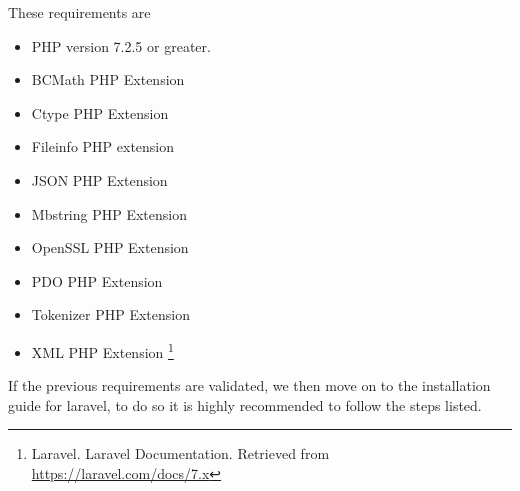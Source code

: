 \medskip These requirements are 
\begin{itemize}
    \item PHP version 7.2.5 or greater. 
    \item BCMath PHP Extension
    \item Ctype PHP Extension
    \item Fileinfo PHP extension
    \item JSON PHP Extension
    \item Mbstring PHP Extension
    \item OpenSSL PHP Extension
    \item PDO PHP Extension
    \item Tokenizer PHP Extension
    \item XML PHP Extension
\cite{laravel}    
\footnote{Laravel. Laravel Documentation. Retrieved from \url{https://laravel.com/docs/7.x} }
\end{itemize}
 \medskip If the previous requirements are validated, we then move on to the installation guide for laravel, to do so it is highly recommended to follow the steps listed.
